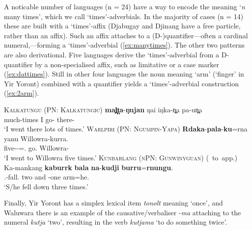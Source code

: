 \documentclass[12pt,egregdoesnotlikesansseriftitles]{scrartcl}
\begin{document}
A noticable number of languages (n = 24) have a way to encode the meaning `\textit{n} many times', which we call `times'-adverbials. In the majority of cases (n = 14) these are built with a `times'-affix (Djabugay and Djinang have a free particle, rather than an affix). Such an affix attaches to a (D-)quantifier---often a cardinal numeral,---forming a `times'-adverbial (\ref{ex:manytimes}). The other two patterns are also derivational. Five languages derive the `times'-adverbial from a D-quantifier by a non-specialised affix, such as limitative or a case marker (\ref{ex:dattimes}). Still in other four languages %
the noun meaning `arm' (`finger' in Yir Yoront) combined with a quantifier %
yields a `times'-adverbial construction (\ref{ex:2arm}).
\begin{exe}
  \ex\label{ex:manytimes} \textsc{Kalkatungu (PN: Kalkatungic)}\hfill {}
  \gll \textbf{mal̪t̪a}-\textbf{ŋujan} ŋai iŋka-n̪a pa-un̪a\\
  much-times I go-\Pst{} there-\All\\
  \glt `I went there lots of times.'
  \ex\label{ex:dattimes} \textsc{Warlpiri (PN: Ngumpin-Yapa)}\hfill {}
  \gll \textbf{Rdaka}-\textbf{pala}-\textbf{ku}=rna yanu Willowra-kurra.\\
  five-\Card-\Dat=\Fsg.\Sbj{} go.\Pst{} Willowra-\All\\
  \glt `I went to Willowra five times.'
  \ex\label{ex:2arm} \textsc{Kunbarlang (nPN: Gunwinyguan)} (\citealt{ikthesis}~to~app.)\\
  \gll Ka-mankang \textbf{kaburrk} \textbf{bala} \textbf{na}-\textbf{kudji} \textbf{burru}=\textbf{rnungu}.\\
  \Tsg.\Nfut-fall.\Pst{} two and \Cli-one arm=he.\Gen\\
  \glt `S/he fell down three times.' %
\end{exe}

Finally, Yir Yoront has a simplex lexical item \textit{tonolt} meaning `once', and Waluwara there is an example of the causative/verbaliser -\textit{\charis ma} attaching to the numeral \textit{\charis kutja} `two', resulting in the verb \textit{\charis kutjama} `to do something twice'. %
\end{document}
